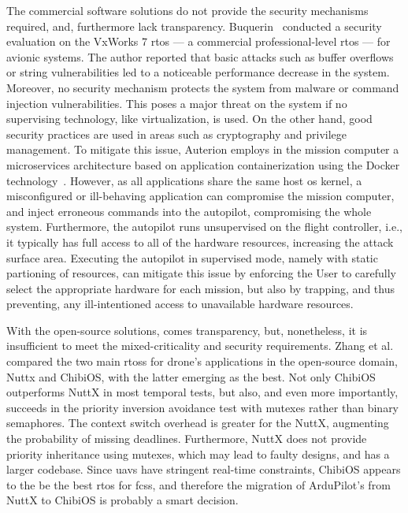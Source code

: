 The commercial software solutions do not provide the security mechanisms
required, and, furthermore lack transparency. 
%
Buquerin~\cite{buquerin2018security} conducted a security evaluation on the
VxWorks 7 \gls{rtos} --- a commercial professional-level \gls{rtos} --- for
avionic systems. The author reported that basic attacks such as
buffer overflows or string vulnerabilities led to a noticeable performance
decrease in the system. Moreover, no security mechanism protects the system
from malware or command injection vulnerabilities. This poses a major threat on
the system if no supervising technology, like virtualization, is used. On the other hand, good security practices are used in
areas such as cryptography and privilege management.
To mitigate this issue, Auterion employs in the mission computer a microservices architecture based on
application containerization using the Docker
technology~\cite{auterion-sw-services}. However, as all applications share the
same host \gls{os} kernel, a misconfigured or ill-behaving application can
compromise the mission computer, and inject erroneous commands into the
autopilot, compromising the whole system. Furthermore, the autopilot runs
unsupervised on the flight controller, i.e., it typically has full access to all
of the hardware resources, increasing the attack surface area. Executing the
autopilot in supervised mode, namely with static partioning of resources, can
mitigate this issue by enforcing the User to carefully select the appropriate
hardware for each mission, but also by trapping, and thus preventing, any ill-intentioned access to unavailable hardware resources.

With the open-source solutions, comes transparency, but, nonetheless, it is
insufficient to meet the mixed-criticality and security requirements.
Zhang et al.~\cite{zhang2021best} compared the two main \glspl{rtos} for drone's applications in the
open-source domain, Nuttx and ChibiOS, with the latter emerging as the best. Not
only ChibiOS outperforms NuttX in most temporal tests, but also, and even more
importantly, succeeds in the priority inversion avoidance test with mutexes
rather than binary semaphores. The context switch overhead is greater for
the NuttX, augmenting the probability of missing deadlines. Furthermore, NuttX
does not provide priority inheritance using mutexes, which may lead to faulty
designs, and has a larger codebase. Since \glspl{uav} have stringent real-time
constraints, ChibiOS appears to the be the best \gls{rtos} for \glspl{fcs}, and
therefore the migration of ArduPilot's from NuttX to ChibiOS is probably a smart
decision.

